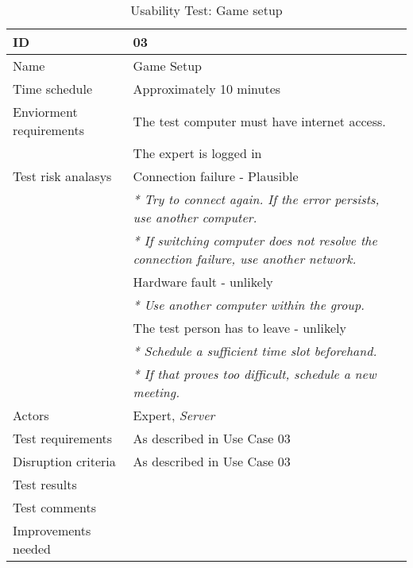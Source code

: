 {\footnotesize
\begin{table}[H]
\begin{tabular}{| p{5cm} | p{10cm} |}\hline
	\textbf{ID}	& \textbf{03} \\ \hline
	Name		& Game Setup\\ \hline
	Time schedule	& Approximately 10 minutes\\ \hline
	Enviorment requirements 
		& The test computer must have internet access. \\
		& The expert is logged in\\ \hline
	Test risk analasys 
		& Connection failure - Plausible \\
		& \emph{* Try to connect again. If the error persists, use another computer.} \\
		& \emph{* If switching computer does not resolve the connection failure, use another network.}\\
		& Hardware fault - unlikely \\
		& \emph{* Use another computer within the group.} \\
		& The test person has to leave - unlikely \\
		& \emph{* Schedule a sufficient time slot beforehand.} \\
		& \emph{* If that proves too difficult, schedule a new meeting.}\\ \hline
	Actors	& Expert, \emph{Server}\\ \hline
	Test requirements & As described in Use Case 03 \\ \hline
	Disruption criteria & As described in Use Case 03  \\ \hline
	Test results 
		& \\ \hline
	Test comments
		& \\ \hline
	Improvements needed
		& \\ \hline
\end{tabular}


\caption{Usability Test: Game setup}
\label{fig:usability_test_3}
\end{table}}




